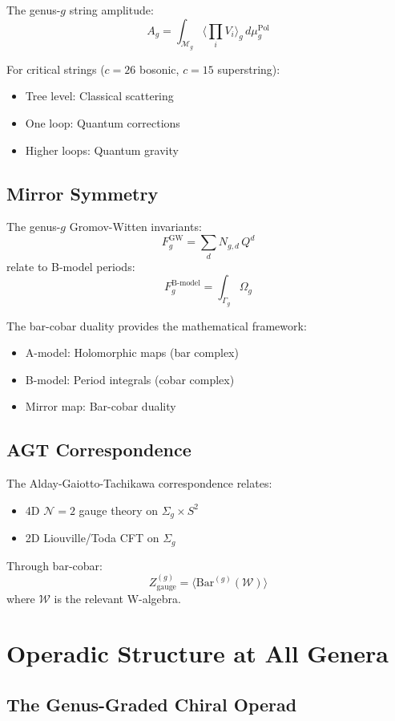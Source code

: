 The genus-$g$ string amplitude:
$$A_g = \int_{\mathcal{M}_g} \langle \prod_i V_i \rangle_g \, d\mu_g^{\text{Pol}}$$

For critical strings ($c=26$ bosonic, $c=15$ superstring):
\begin{itemize}
\item Tree level: Classical scattering
\item One loop: Quantum corrections
\item Higher loops: Quantum gravity
\end{itemize}

\section{Mirror Symmetry}

The genus-$g$ Gromov-Witten invariants:
$$F_g^{\text{GW}} = \sum_{d} N_{g,d} \, Q^d$$
relate to B-model periods:
$$F_g^{\text{B-model}} = \int_{\Gamma_g} \Omega_g$$

The bar-cobar duality provides the mathematical framework:
\begin{itemize}
\item A-model: Holomorphic maps (bar complex)
\item B-model: Period integrals (cobar complex)
\item Mirror map: Bar-cobar duality
\end{itemize}

\section{AGT Correspondence}

The Alday-Gaiotto-Tachikawa correspondence relates:
\begin{itemize}
\item 4D $\mathcal{N}=2$ gauge theory on $\Sigma_g \times S^2$
\item 2D Liouville/Toda CFT on $\Sigma_g$
\end{itemize}

Through bar-cobar:
$$Z_{\text{gauge}}^{(g)} = \langle \text{Bar}^{(g)}(\mathcal{W}) \rangle$$
where $\mathcal{W}$ is the relevant W-algebra.

\chapter{Operadic Structure at All Genera}

\section{The Genus-Graded Chiral Operad}

